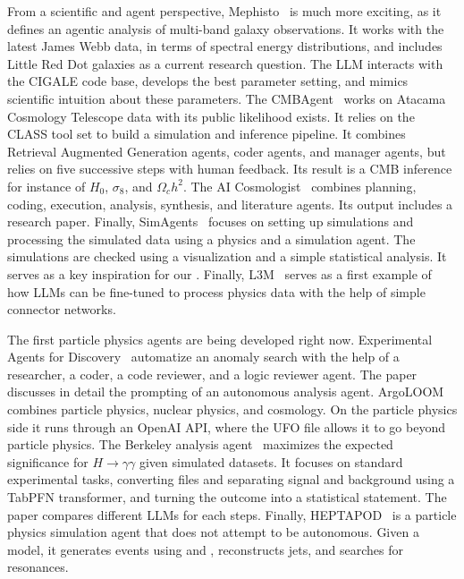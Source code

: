 \documentclass[submission, Phys]{SciPost}
\begin{document}
From a scientific and agent perspective, Mephisto~\cite{sun2025interpretingmultibandgalaxyobservations} is much more exciting, as it defines an agentic analysis of multi-band galaxy observations. It works with the latest James Webb data, in terms of spectral energy distributions, and includes Little Red Dot galaxies as a current research question. The LLM interacts with the CIGALE code base, develops the best parameter setting, and mimics scientific intuition about these parameters.  The CMBAgent~\cite{Laverick:2024fyh} works on Atacama Cosmology Telescope data with its public likelihood exists. It relies on the CLASS tool set to build a simulation and inference pipeline. 
It combines Retrieval Augmented Generation agents, coder agents, and manager agents, but relies on five successive steps with human feedback. Its result is a CMB inference for instance of $H_0$, $\sigma_8$, and $\Omega_c h^2$. The AI Cosmologist~\cite{Moss:2025ynt} combines planning, coding, execution, analysis, synthesis, and literature agents. Its output includes a research paper. Finally, SimAgents~\cite{Zhang:2025uoo} focuses on setting up simulations and processing the simulated data using a physics and a simulation agent. The simulations are checked using a visualization and a simple statistical analysis. It serves as a key inspiration for our \ma. Finally, L3M~\cite{Heneka:2025fpe} serves as a first example of how LLMs can be fine-tuned to process physics data with the help of simple connector networks.

The first particle physics agents are being developed right now. Experimental Agents for Discovery~\cite{Diefenbacher:2025zzn} automatize an anomaly search with the help of a researcher, a coder, a code reviewer, and a logic reviewer agent. The paper discusses in detail the prompting of an autonomous analysis agent. ArgoLOOM~\cite{Bakshi:2025fgx} combines particle physics, nuclear physics, and cosmology. On the particle physics side it runs \mg through an OpenAI API, where the UFO file allows it to go beyond particle physics. The Berkeley analysis agent~\cite{Gendreau-Distler:2025fsj} maximizes the expected significance for $H \to \gamma \gamma$ given simulated datasets. It focuses on standard experimental tasks, converting \root files and separating signal and background using a TabPFN transformer, and turning the outcome into a statistical statement. The paper compares different LLMs for each steps. Finally, HEPTAPOD~\cite{Menzo:2025cim} is a particle physics simulation agent that does not attempt to be autonomous. Given a model, it generates events using \mg and \pythia, reconstructs jets, and searches for resonances. 
\end{document}

